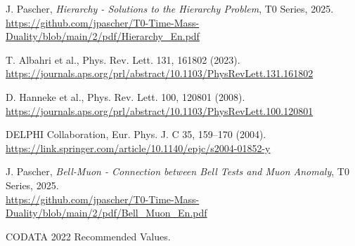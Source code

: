 \documentclass[12pt,a4paper]{article}
\begin{document}
\begin{thebibliography}{99}
		 J. Pascher, \textit{Hierarchy - Solutions to the Hierarchy Problem}, T0 Series, 2025. \\
		\url{https://github.com/jpascher/T0-Time-Mass-Duality/blob/main/2/pdf/Hierarchy_En.pdf}
		
		 T. Albahri et al., Phys. Rev. Lett. 131, 161802 (2023). \\
		\url{https://journals.aps.org/prl/abstract/10.1103/PhysRevLett.131.161802}
		
		 D. Hanneke et al., Phys. Rev. Lett. 100, 120801 (2008). \\
		\url{https://journals.aps.org/prl/abstract/10.1103/PhysRevLett.100.120801}
		
		 DELPHI Collaboration, Eur. Phys. J. C 35, 159--170 (2004). \\
		\url{https://link.springer.com/article/10.1140/epjc/s2004-01852-y}
		
		 J. Pascher, \textit{Bell-Muon - Connection between Bell Tests and Muon Anomaly}, T0 Series, 2025. \\
		\url{https://github.com/jpascher/T0-Time-Mass-Duality/blob/main/2/pdf/Bell_Muon_En.pdf}
		
		 CODATA 2022 Recommended Values.
	\end{thebibliography}
	
\end{document}
